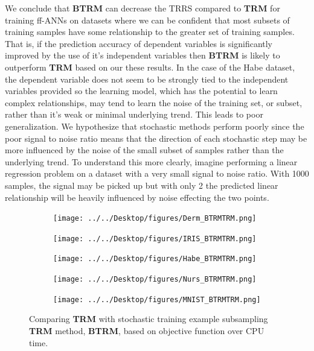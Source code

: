 \documentclass[letterpaper,12pt,titlepage,oneside,final]{book}
\begin{document}
	
	We conclude that \textbf{BTRM} can decrease the TRRS compared to \textbf{TRM} for training ff-ANNs on datasets where we can be confident that most subsets of training samples have some relationship to the greater set of training samples. That is, if the prediction accuracy of dependent variables is significantly improved by the use of it's independent variables then \textbf{BTRM} is likely to outperform \textbf{TRM} based on our these results. In the case of the Habe dataset, the dependent variable does not seem to be strongly tied to the independent variables provided so the learning model, which has the potential to learn complex relationships, may tend to learn the noise of the training set, or subset, rather than it's weak or minimal underlying trend. This leads to poor generalization. We hypothesize that stochastic methods perform poorly since the poor signal to noise ratio means that the direction of each stochastic step may be more influenced by the noise of the small subset of samples rather than the underlying trend. To understand this more clearly, imagine performing a linear regression problem on a dataset with a very small signal to noise ratio. With 1000 samples, the signal may be picked up but with only 2 the predicted linear relationship will be heavily influenced by noise effecting the two points. 
	
	\begin{figure}
		\centering
		\begin{subfigure}{.45\textwidth}
			\texttt{[image: ../../Desktop/figures/Derm\_BTRMTRM.png]}
		\end{subfigure}%
		\begin{subfigure}{.45\textwidth}
			\texttt{[image: ../../Desktop/figures/IRIS\_BTRMTRM.png]}
		\end{subfigure}
		\begin{subfigure}{.45\textwidth}
			\texttt{[image: ../../Desktop/figures/Habe\_BTRMTRM.png]}
		\end{subfigure}
		\begin{subfigure}{.45\textwidth}
			\texttt{[image: ../../Desktop/figures/Nurs\_BTRMTRM.png]}
		\end{subfigure}
		\begin{subfigure}{.45\textwidth}
			\texttt{[image: ../../Desktop/figures/MNIST\_BTRMTRM.png]}
		\end{subfigure}
		\caption{Comparing \textbf{TRM} with stochastic training example subsampling \textbf{TRM} method, \textbf{BTRM}, based on objective function over CPU time.}
		\label{figure:BTRMTRM}
	\end{figure}
\end{document}

